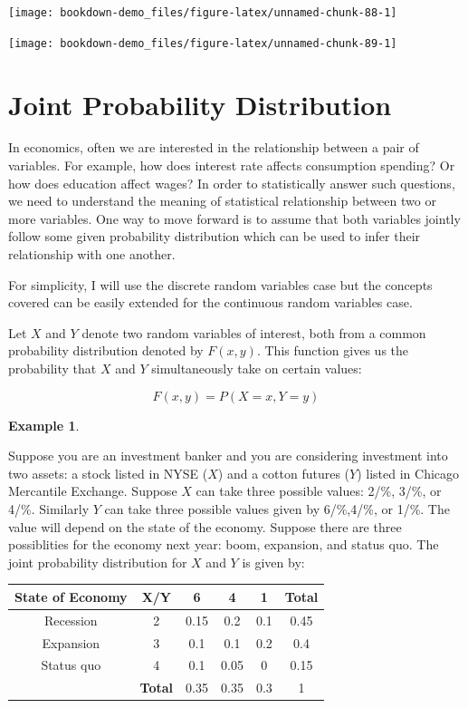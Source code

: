 \documentclass[
]{book}
\theoremstyle{definition}
\theoremstyle{definition}
\newtheorem{example}{Example}[chapter]
\theoremstyle{definition}
\theoremstyle{definition}
\theoremstyle{remark}
\begin{document}
\begin{center}\texttt{[image: bookdown-demo\_files/figure-latex/unnamed-chunk-88-1]} \end{center}

\begin{center}\texttt{[image: bookdown-demo\_files/figure-latex/unnamed-chunk-89-1]} \end{center}

\hypertarget{joint-probability-distribution}{%
\section{Joint Probability Distribution}\label{joint-probability-distribution}}

In economics, often we are interested in the relationship between a pair of variables. For example, how does interest rate affects consumption spending? Or how does education affect wages? In order to statistically answer such questions, we need to understand the meaning of statistical relationship between two or more variables. One way to move forward is to assume that both variables jointly follow some given probability distribution which can be used to infer their relationship with one another.

For simplicity, I will use the discrete random variables case but the concepts covered can be easily extended for the continuous random variables case.

Let \(X\) and \(Y\) denote two random variables of interest, both from a common probability distribution denoted by \(F(x,y)\). This function gives us the probability that \(X\) and \(Y\) simultaneously take on certain values:

\[F(x,y)=P(X=x, Y=y)\]

\begin{example}
\protect\hypertarget{exm:unnamed-chunk-90}{}\label{exm:unnamed-chunk-90}

Suppose you are an investment banker and you are considering investment into two assets: a stock listed in NYSE (\(X\)) and a cotton futures (\(Y\)) listed in Chicago Mercantile Exchange. Suppose \(X\) can take three possible values: 2/\%, 3/\%, or 4/\%. Similarly \(Y\) can take three possible values given by 6/\%,4/\%, or 1/\%. The value will depend on the state of the economy. Suppose there are three possiblities for the economy next year: boom, expansion, and status quo. The joint probability distribution for \(X\) and \(Y\) is given by:

\begin{longtable}[]{@{}cccccc@{}}
\toprule\noalign{}
State of Economy & X/Y & 6 & 4 & 1 & Total \\
\midrule\noalign{}
\endhead
\bottomrule\noalign{}
\endlastfoot
Recession & 2 & 0.15 & 0.2 & 0.1 & 0.45 \\
Expansion & 3 & 0.1 & 0.1 & 0.2 & 0.4 \\
Status quo & 4 & 0.1 & 0.05 & 0 & 0.15 \\
& \textbf{Total} & 0.35 & 0.35 & 0.3 & 1 \\
\end{longtable}

\end{example}
\end{document}
